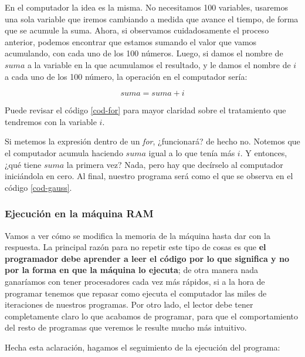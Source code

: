 En el computador la idea es la misma. No necesitamos 100 variables, usaremos una sola variable que iremos cambiando a medida que avance el tiempo, de forma que se acumule la suma. Ahora, si observamos cuidadosamente el proceso anterior, podemos encontrar que estamos sumando el valor que vamos acumulando, con cada uno de los 100 números. Luego, si damos el nombre de $suma$ a la variable en la que acumulamos el resultado, y le damos el nombre de $i$ a cada uno de los 100 número, la operación en el computador sería: 

\begin{equation}
suma = suma + i
\end{equation}

Puede revisar el código \ref{cod-for} para mayor claridad sobre el tratamiento que tendremos con la variable $i$.

Si metemos la expresión dentro de un \emph{for}, ¿funcionará? de hecho no. Notemos que el computador acumula haciendo $suma$ igual a lo que tenía más $i$. Y entonces, ¿qué tiene $suma$ la primera vez? Nada, pero hay que decírselo al computador iniciándola en cero. Al final, nuestro programa será como el que se observa en el código \ref{cod-gauss}. \\



\subsubsection{Ejecución en la máquina RAM}

Vamos a ver cómo se modifica la memoria de la máquina hasta dar con la respuesta. La principal razón para no repetir este tipo de cosas es que \textbf{el programador debe aprender a leer el código por lo que significa y no por la forma en que la máquina lo ejecuta}; de otra manera nada ganaríamos con tener procesadores cada vez más rápidos, si a la hora de programar tenemos que repasar como ejecuta el computador las miles de iteraciones de nuestros programas. Por otro lado, el lector debe tener completamente claro lo que acabamos de programar, para que el comportamiento del resto de programas que veremos le resulte mucho más intuitivo.

Hecha esta aclaración, hagamos el seguimiento de la ejecución del programa:

